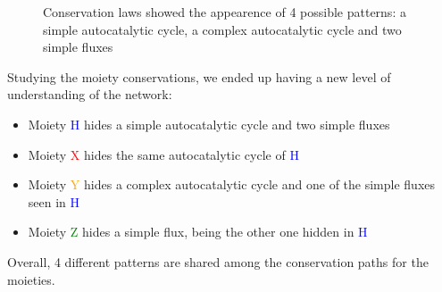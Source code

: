 \documentclass{article}
\begin{document}
\begin{figure}[H]
\begin{center}
\begin{minipage}{0.45\textwidth}


    \end{minipage}
    
\end{center}
\caption{Conservation laws showed the appearence of 4 possible patterns: a simple autocatalytic cycle, a complex autocatalytic cycle and two simple fluxes}
\label{patterns}



\end{figure}

Studying the moiety conservations, we ended up having a new level of understanding of the network:
\begin{itemize}
    \item Moiety \textcolor{blue}{H} hides a simple autocatalytic cycle and two simple fluxes
    \item Moiety \textcolor{red}{X} hides the same autocatalytic cycle of \textcolor{blue}{H}
    \item Moiety \textcolor{orange}{Y} hides a complex autocatalytic cycle and one of the simple fluxes seen in \textcolor{blue}{H}
    \item Moiety \textcolor{green}{Z} hides a simple flux, being the other one hidden in \textcolor{blue}{H}
    \end{itemize}

Overall, 4 different patterns are shared among the conservation paths for the moieties. 
\hfill \break
\end{document}
